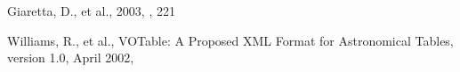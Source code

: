 \documentclass[11pt,twoside]{article}
\begin{document}
\begin{references}
Giaretta, D., %
et al.,
2003,
\adassxii,
221

Williams, R., %
et al.,
VOTable: A Proposed XML Format for Astronomical Tables, version 1.0,
April 2002,

\end{references}
\end{document}
